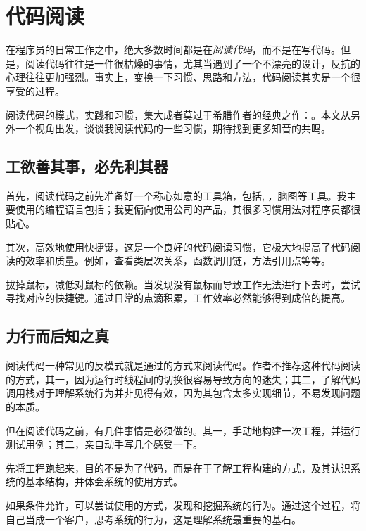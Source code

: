 \chapter{代码阅读} 
\label{ch:code-reading}

\begin{content}

在程序员的日常工作之中，绝大多数时间都是在\emph{阅读代码}，而不是在写代码。但是，阅读代码往往是一件很枯燥的事情，尤其当遇到了一个不漂亮的设计，反抗的心理往往更加强烈。事实上，变换一下习惯、思路和方法，代码阅读其实是一个很享受的过程。

阅读代码的模式，实践和习惯，集大成者莫过于希腊作者的经典之作：。本文从另外一个视角出发，谈谈我阅读代码的一些习惯，期待找到更多知音的共鸣。

\end{content}

\section{工欲善其事，必先利其器}

\begin{content}

首先，阅读代码之前先准备好一个称心如意的工具箱，包括, ，脑图等工具。我主要使用的编程语言包括；我更偏向使用公司的产品，其很多习惯用法对程序员都很贴心。

其次，高效地使用快捷键，这是一个良好的代码阅读习惯，它极大地提高了代码阅读的效率和质量。例如，查看类层次关系，函数调用链，方法引用点等等。

\begin{remark}
拔掉鼠标，减低对鼠标的依赖。当发现没有鼠标而导致工作无法进行下去时，尝试寻找对应的快捷键。通过日常的点滴积累，工作效率必然能够得到成倍的提高。
\end{remark}

\end{content}

\section{力行而后知之真}

\begin{content}

阅读代码一种常见的反模式就是通过的方式来阅读代码。作者不推荐这种代码阅读的方式，其一，因为运行时线程间的切换很容易导致方向的迷失；其二，了解代码调用栈对于理解系统行为并非见得有效，因为其包含太多实现细节，不易发现问题的本质。

但在阅读代码之前，有几件事情是必须做的。其一，手动地构建一次工程，并运行测试用例；其二，亲自动手写几个感受一下。

先将工程跑起来，目的不是为了代码，而是在于了解工程构建的方式，及其认识系统的基本结构，并体会系统的使用方式。

如果条件允许，可以尝试使用的方式，发现和挖掘系统的行为。通过这个过程，将自己当成一个客户，思考系统的行为，这是理解系统最重要的基石。

\end{content}

